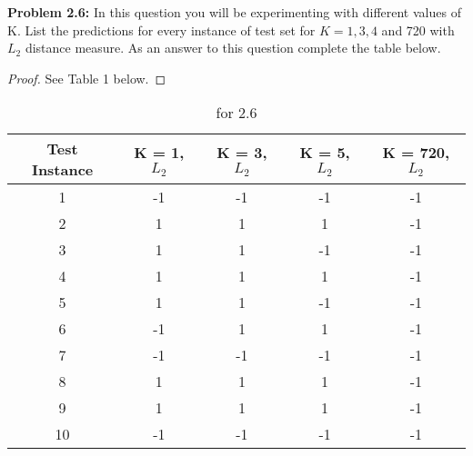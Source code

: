 \documentclass[11pt]{amsart}
\newenvironment{problem}[1]
{\par \noindent \ignorespaces \textbf{Problem #1:}}
{}
\begin{document}
\begin{problem}{2.6} In this question you will be experimenting with different values of K. List the predictions for every instance of test set for $K = 1, 3,4$ and 720 with $L_2$ distance measure. As an answer to this question complete the table below. 
\end{problem}
\begin{proof}See Table 1 below.
\end{proof} 
\begin{table}[h]
\caption{for 2.6}
\begin{tabular}{ccccc}
\hline
\multicolumn{1}{|c|}{Test Instance} & \multicolumn{1}{c|}{K = 1, $L_2$} & \multicolumn{1}{c|}{K = 3, $L_2$} & \multicolumn{1}{c|}{K = 5, $L_2$} & \multicolumn{1}{c|}{K = 720, $L_2$} \\ \hline
1                                   & -1                             & -1                             & -1                             & -1                               \\
2                                   & 1                              & 1                              & 1                              & -1                               \\
3                                   & 1                              & 1                              & -1                             & -1                               \\
4                                   & 1                              & 1                              & 1                              & -1                               \\
5                                   & 1                              & 1                              & -1                             & -1                               \\
6                                   & -1                             & 1                              & 1                              & -1                               \\
7                                   & -1                             & -1                             & -1                             & -1                               \\
8                                   & 1                              & 1                              & 1                              & -1                               \\
9                                   & 1                              & 1                              & 1                              & -1                               \\
10                                  & -1                             & -1                             & -1                             & -1                              
\end{tabular}
\end{table}
\end{document}

